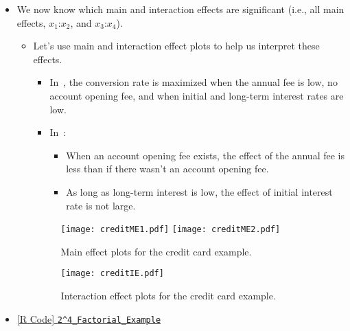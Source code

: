 \begin{itemize}
\begin{itemize}
            \end{itemize}
      \item We now know which main and interaction effects are significant (i.e., all main effects, $ x_1 $:$ x_2 $, and $ x_3 $:$ x_4 $).
            \begin{itemize}
                  \item Let's use main and interaction effect plots to help us interpret these effects.
                        \begin{itemize}
                              \item In~, the conversion rate is maximized when the annual fee is low, no account opening fee, and
                                    when initial and long-term interest rates are low.
                              \item In~:
                                    \begin{itemize}
                                          \item When an account opening fee exists, the effect of the annual fee is less than if there wasn't an account opening fee.
                                          \item As long as long-term interest is low, the effect of initial interest rate is not large.
                                    \end{itemize}
                        \end{itemize}
                        \begin{figure}[!htbp]
                              \centering
                              \texttt{[image: creditME1.pdf]}\hfill
                              \texttt{[image: creditME2.pdf]}
                              \caption{Main effect plots for the credit card example.}\label{fig:creditME}
                        \end{figure}
                        \begin{figure}[!htbp]
                              \centering
                              \texttt{[image: creditIE.pdf]}
                              \caption{Interaction effect plots for the credit card example.}\label{fig:creditIE}
                        \end{figure}
            \end{itemize}
      \item \href{https://github.com/Hextical/university-notes/blob/master/year-3/semester-3/STAT 430/code/W9/2^4_Factorial_Example.R}{[R Code] \texttt{2\^{}4\_Factorial\_Example}}
\end{itemize}
